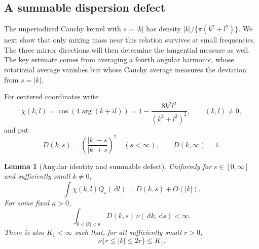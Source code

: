 \documentclass[11pt]{article}
\newcommand{\dd}{\,\mathrm d}
\newtheorem{lemma}[theorem]{Lemma}
\theoremstyle{definition}
\theoremstyle{remark}
\numberwithin{equation}{section}
\begin{document}
\subsection{A summable dispersion defect}

The unperiodized Cauchy kernel with $s=|k|$ has density
$|k|/\{\pi(k^2+l^2)\}$.  We next show that only mixing mass near this
relation survives at small frequencies.  The three mirror directions
will then determine the tangential measure as well.  The key estimate
comes from averaging a fourth angular harmonic, whose rotational average
vanishes but whose Cauchy average measures the deviation from $s=|k|$.

For centered coordinates write
\[
 \chi(k,l)=\cos(4\arg(k+il))
   =1-\frac{8k^2l^2}{(k^2+l^2)^2},\qquad (k,l)\ne0,
\]
and put
\[
 D(k,s)=\left(\frac{|k|-s}{|k|+s}\right)^2\quad(s<\infty),
 \qquad D(k,\infty)=1.
\]

\begin{lemma}[Angular identity and summable defect]
\label{plane:lem:defect}
Uniformly for $s\in[0,\infty]$ and sufficiently small $k\ne0$,
\begin{equation}
 \label{plane:eq:poisson}
 \int\chi(k,l)Q_s(\dd l)=D(k,s)+O(|k|).
\end{equation}
For some fixed $\kappa>0$,
\begin{equation}
 \label{plane:eq:defect}
 \int_{0<|k|<\kappa}D(k,s)\,\nu(\dd k,\dd s)<\infty.
\end{equation}
There is also $K_1<\infty$ such that, for all sufficiently small $r>0$,
\begin{equation}
 \label{plane:eq:bands}
 \nu\{r\le|k|\le2r\}\le K_1.
\end{equation}
\end{lemma}
\end{document}
